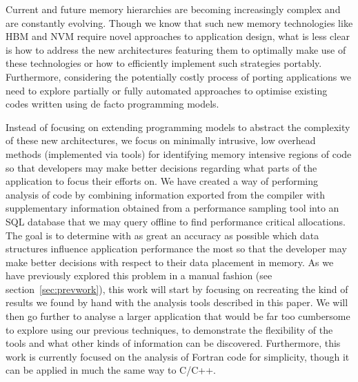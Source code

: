 Current and future memory hierarchies are becoming increasingly complex and are constantly evolving.
Though we know that such new memory technologies like \ac{HBM} and \ac{NVM} require novel approaches to application design, what is less clear is how to address the new architectures featuring them to optimally make use of these technologies or how to efficiently implement such strategies portably.
Furthermore, considering the potentially costly process of porting applications we need to explore partially or fully automated approaches to optimise existing codes written using de facto programming models.

Instead of focusing on extending programming models to abstract the complexity of these new architectures, we focus on  minimally intrusive, low overhead methods (implemented via tools) for identifying memory intensive regions of code so that developers may make better decisions regarding what parts of the application to focus their efforts on.
We have created a way of performing analysis of code by combining information exported from the compiler with supplementary information obtained from a performance sampling tool into an \acs{SQL} database that we may query offline to find performance critical allocations.
The goal is to determine with as great an accuracy as possible which data structures influence application performance the most so that the developer may make better decisions with respect to their data placement in memory.
As we have previously explored this problem in a manual fashion (see section~\ref{sec:prevwork})\cite{Doudali:2017:CTE:3132402.3132418}, this work will start by focusing on recreating the kind of results we found by hand with the analysis tools described in this paper.
We will then go further to analyse a larger application that would be far too cumbersome to explore using our previous techniques, to demonstrate the flexibility of the tools and what other kinds of information can be discovered.
Furthermore, this work is currently focused on the analysis of Fortran code for simplicity, though it can be applied in much the same way to C/C++.


